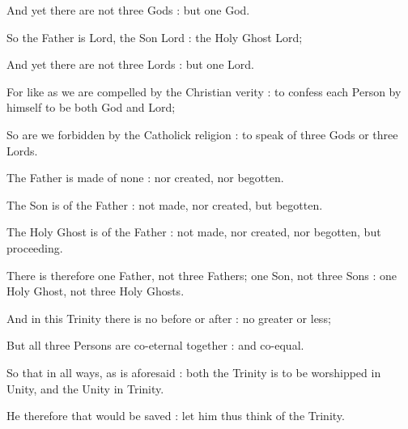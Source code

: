 {    And yet there are not three Gods : but one God.\par
    So the Father is Lord, the Son Lord : the Holy Ghost Lord;\par
    And yet there are not three Lords : but one Lord.\par
    For like as we are compelled by the Christian verity : to confess each Person by himself to be both God and Lord;\par
    So are we forbidden by the Catholick religion : to speak of three Gods or three Lords.\par
    The Father is made of none : nor created, nor begotten.\par
    The Son is of the Father : not made, nor created, but begotten.\par
    The Holy Ghost is of the Father : not made, nor created, nor begotten, but proceeding.\par
    There is therefore one Father, not three Fathers; one Son, not three Sons : one Holy Ghost, not three Holy Ghosts.\par
    And in this Trinity there is no before or after : no greater or less;\par
    But all three Persons are co-eternal together : and co-equal.\par
    So that in all ways, as is aforesaid : both the Trinity is to be worshipped in Unity, and the Unity in Trinity.\par
    He therefore that would be saved : let him thus think of the Trinity.

}
